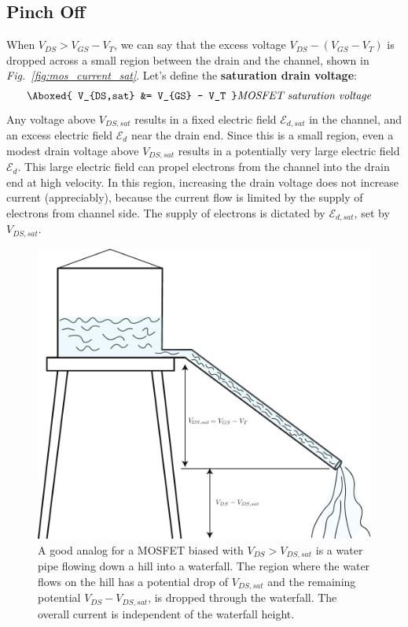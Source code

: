 \subsection{Pinch Off}
When $V_{DS} > V_{GS}-V_T$, we can say that the excess voltage $V_{DS} - (V_{GS}-V_T)$ is dropped across a small region between the drain and the channel, shown in \emph{Fig.~\ref{fig:mos_current_sat}}.  Let's define the \textbf{saturation drain voltage}:
    \begin{align}
        \Aboxed{ V_{DS,sat} &= V_{GS} - V_T } &\textit{MOSFET saturation voltage}
        \label{eq:saturation_voltage}
    \end{align}
Any voltage above $V_{DS,sat}$ results in a fixed electric field $\mathcal{E}_{d,sat}$ in the channel, and an excess electric field $\mathcal{E}_d$ near the drain end.  Since this is a small region, even a modest drain voltage above $V_{DS,sat}$ results in a potentially very large electric field $\mathcal{E}_d$.  This large electric field can propel electrons from the channel into the drain end at high velocity.  In this region, increasing the drain voltage does not increase current (appreciably), because the current flow is limited by the supply of electrons from channel side.  The supply of electrons is dictated by $\mathcal{E}_{d,sat}$, set by $V_{DS,sat}$.
\newpage
\begin{figure}[t]
\centering
\includegraphics[width=\columnwidth]{waterfall}
\caption{A good analog for a MOSFET biased with $V_{DS} > V_{DS,sat}$ is a water pipe flowing down a hill into a waterfall.  The region where the water flows on the hill has a potential drop of $V_{DS,sat}$ and the remaining potential $V_{DS} - V_{DS,sat}$, is dropped through the waterfall.  The overall current is independent of the waterfall height.}
\label{fig:waterfall}
\end{figure}
